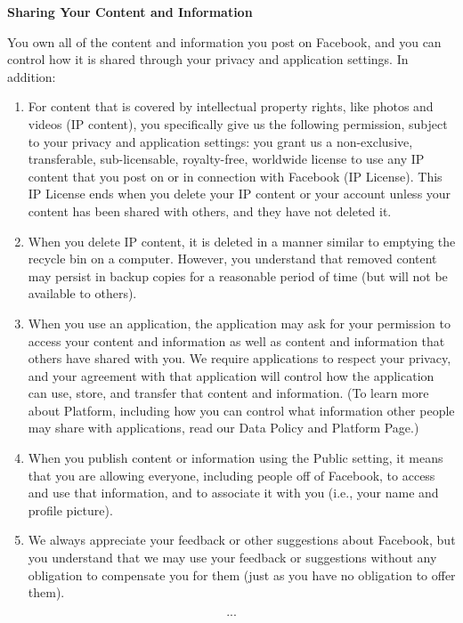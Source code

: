 \documentclass[showtrims,oldfontcommands]{kthesis}
\begin{document}
\begin{appendices}
\begin{quote_tos}
        \textbf{Sharing Your Content and Information}

        You own all of the content and information you post on Facebook, and you can control 
        how it is shared through your privacy and application settings. In addition:

        \begin{enumerate}
            \item For content that is covered by intellectual property rights, like photos 
            and videos (IP content), you specifically give us the following permission, 
            subject to your privacy and application settings: you grant us a non-exclusive, 
            transferable, sub-licensable, royalty-free, worldwide license to use any IP 
            content that you post on or in connection with Facebook (IP License). This IP 
            License ends when you delete your IP content or your account unless your content 
            has been shared with others, and they have not deleted it.
    
            \item When you delete IP content, it is deleted in a manner similar to emptying 
            the recycle bin on a computer. However, you understand that removed content 
            may persist in backup copies for a reasonable period of time (but will not be 
            available to others).
    
            \item When you use an application, the application may ask for your permission 
            to access your content and information as well as content and information that 
            others have shared with you.  We require applications to respect your privacy, 
            and your agreement with that application will control how the application can 
            use, store, and transfer that content and information.  (To learn more about 
            Platform, including how you can control what information other people may share 
            with applications, read our Data Policy and Platform Page.)
    
            \item When you publish content or information using the Public setting, it means 
            that you are allowing everyone, including people off of Facebook, to access 
            and use that information, and to associate it with you (i.e., your name and 
            profile picture).
    
            \item We always appreciate your feedback or other suggestions about Facebook, 
            but you understand that we may use your feedback or suggestions without any 
            obligation to compensate you for them (just as you have no obligation to offer 
            them).
        \end{enumerate}
        \[...\]
    \end{quote_tos}


\end{appendices}
\end{document}
